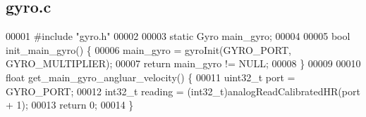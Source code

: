 \subsection{gyro.\+c}
\label{a00098_source}

\begin{DoxyCode}
00001 \textcolor{preprocessor}{#include "gyro.h"}
00002 
00003 \textcolor{keyword}{static} Gyro main_gyro;
00004 
00005 \textcolor{keywordtype}{bool} init_main_gyro() \{
00006   main_gyro = gyroInit(GYRO_PORT, GYRO_MULTIPLIER);
00007   \textcolor{keywordflow}{return} main_gyro != NULL;
00008 \}
00009 
00010 \textcolor{keywordtype}{float} get_main_gyro_angluar_velocity() \{
00011   uint32\_t port = GYRO_PORT;
00012   int32\_t reading = (int32\_t)analogReadCalibratedHR(port + 1);
00013   \textcolor{keywordflow}{return} 0;
00014 \}
\end{DoxyCode}
